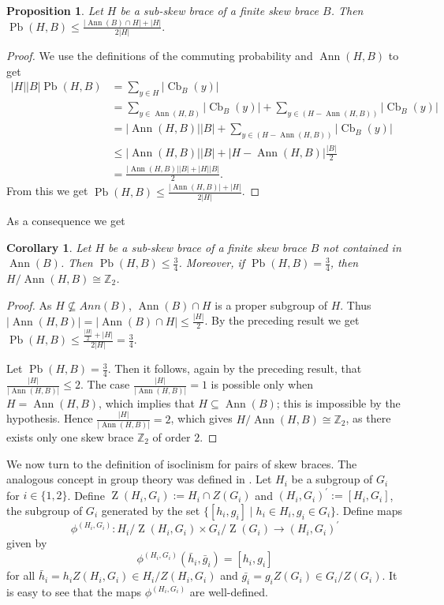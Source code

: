 \documentclass[10pt,a4paper]{amsart}
\numberwithin{equation}{section}
\newtheorem{cor}[equation]{Corollary}
\newtheorem{pro}[equation]{Proposition}
\newcommand{\Z}{\operatorname{Z} }
\newcommand{\Cb}{\operatorname{Cb} }
\newcommand{\Pb}{\operatorname{Pb} }
\newcommand{\Ann}{\operatorname{Ann} }
\begin{document}
\begin{pro} %
Let $H$ be a sub-skew brace of a finite skew brace $B$. Then    $\Pb (H,B)\leqslant \frac{|\Ann(B) \cap H|+|H|}{2|H|}.$
\end{pro}
\begin{proof}
 We use the definitions of the commuting probability and $\Ann(H, B)$ to get 
      \begin{align*}
            {|H||B|}\Pb(H,B)&=\sum_{y\in H}|\Cb_{B}(y)|\\
                             &=\sum_{y\in \Ann(H,B)}|\Cb_{B}(y)|+\sum_{y\in (H- \Ann(H,B))}|\Cb_{B}(y)| \\
                             &=|\Ann(H,B)||B|+\sum_{y\in (H-\Ann(H,B))}|\Cb_{B}(y)| \\
                             &\leqslant |\Ann(H,B)||B|+|H-\Ann(H,B)|\frac{|B|}{2}\\
                             & =\frac{|\Ann(H,B)||B|+|H||B|}{2}.
      \end{align*}
  From this we get $\Pb(H,B)\leqslant \frac{|\Ann(H,B)|+|H|}{2|H|}$.
\end{proof}

As a consequence we get
\begin{cor}
   Let $H$ be a sub-skew brace of a finite skew brace $B$ not contained in $\Ann(B)$. Then  $\Pb (H,B)\leqslant \frac{3}{4}$. Moreover, if $\Pb (H,B)= \frac{3}{4}$, then $H/{\Ann(H,B)}\cong \mathbb{Z}_2$.
\end{cor}
\begin{proof}
    As $H\nsubseteq Ann(B)$, $\Ann(B)\cap H$ is a proper subgroup of $H$. Thus $|\Ann(H, B)| = |\Ann(B)\cap H| \leqslant \frac{|H|}{2}$. By the preceding result we get  $\Pb (H,B)\leqslant \frac{\frac{|H|}{2}+|H|}{2|H|}=\frac{3}{4}$.

    Let   $\Pb(H,B) = \frac{3}{4}$. Then  it follows, again by the preceding result, that $\frac{|H|}{|\Ann(H,B)|} \leqslant 2$. The case $\frac{|H|}{|\Ann(H,B)|} = 1$ is possible only when $H = \Ann(H, B)$, which implies that $H \subseteq \Ann(B)$; this is impossible by the hypothesis.   Hence 
      $\frac{|H|}{|\Ann(H,B)|}=2$, which gives $H/{\Ann(H,B)}\cong \mathbb{Z}_2$, as there exists only one skew brace $\mathbb{Z}_2$ of order $2$.
\end{proof}

We now turn to the definition of isoclinism for pairs of skew braces. The analogous concept in group theory was defined in \cite{ERR13}. Let $H_i$ be a subgroup of $G_i$ for $i\in\{1,2\}$.  Define $\Z{(H_i,G_i)}:=H_i\cap Z(G_i)$ and $(H_i,G_i)^\prime := [H_i,G_i]$, the subgroup of $G_i$ generated by the set $\{[h_i, g_i] \mid h_i\in H_i,g_i\in G_i\}$. Define maps  
$${\phi^{(H_i,G_i)}} : H_i/\Z{(H_i,G_i)} \times G_i/\Z(G_i) \to  (H_i,G_i)^\prime$$
given by
$${\phi^{(H_i,G_i)}}(\bar{h}_i,\bar{g}_i)= [h_i,g_i]$$
for all $\bar{h}_i=h_iZ{(H_i,G_i)}\in {H_i/Z{(H_i,G_i)}}$ and  $\bar{g_i}=g_iZ{(G_i)}\in {G_i/Z{(G_i)}}$. It is easy to see that the maps $\phi^{(H_i,G_i)}$ are well-defined.
\end{document}
